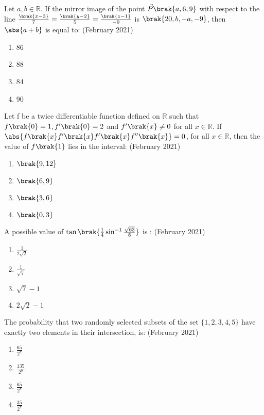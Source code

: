 \iffalse
\title{02-24-2021-shift-2-1-15}
\author{AI24BTECH11011}
\section{mcq-single}
\fi
	\item Let $a,b \in \mathbb{R}$. If the mirror image of the point $\vec{P}\brak{a,6,9}$ with respect to the line $\frac{\brak{x-3}}{7}=\frac{\brak{y-2}}{5}=\frac{\brak{z-1}}{-9}$ is $\brak{20,b,-a,-9}$, then $\abs{a+b}$ is equal to:
		\hfill{(February 2021)}
		\begin{enumerate}
        \item 86
        \item 88
        \item 84
        \item 90
    \end{enumerate}
    \item Let f be a twice differentiable function defined on $\mathbb{R}$ such that $f\brak{0}=1,f^{\prime}\brak{0}=2$ and $f^{\prime}\brak{x}\neq0$ for all $x \in\mathbb{R}$. If $\abs{f\brak{x}f^{\prime}\brak{x}f^{\prime}\brak{x}f''\brak{x}}=0$, for all $x \in \mathbb{R}$, then the value of $f\brak{1}$ lies in the interval:
    \hfill{(February 2021)} 
	\begin{enumerate}
        \item $\brak{9,12}$
        \item $\brak{6,9}$
        \item $\brak{3,6}$
        \item $\brak{0,3}$
    \end{enumerate}
    \item A possible value of $\tan\brak{\frac{1}{4}\sin^{-1}\frac{\sqrt{63}}{8}}$ is :
    \hfill{(February 2021)} 
	\begin{enumerate}
        \item $\frac{1}{2\sqrt{2}}$
        \item $\frac{1}{\sqrt{7}}$
        \item $\sqrt{7}-1$
        \item $2\sqrt{2}-1$
    \end{enumerate}
    \item The probability that two randomly selected subsets of the set $\{1,2,3,4,5\}$ have exactly two elements in their intersection, is:
    \hfill{(February 2021)} 
	\begin{enumerate}
        \item $\frac{65}{2^{7}}$
        \item $\frac{135}{2^{9}}$
        \item $\frac{65}{2^{8}}$
        \item $\frac{35}{2^{7}}$
    \end{enumerate}
